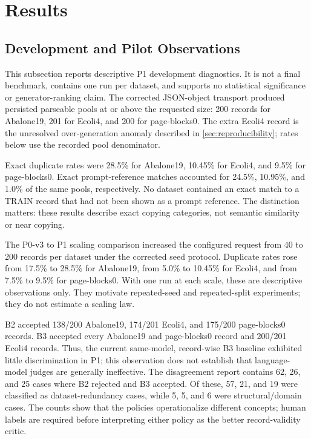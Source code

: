 \section{Results}
\label{sec:results}

\subsection{Development and Pilot Observations}
\label{sec:pilot-results}

This subsection reports descriptive P1 development diagnostics. It is not a
final benchmark, contains one run per dataset, and supports no statistical
significance or generator-ranking claim. The corrected JSON-object transport
produced persisted parseable pools at or above the requested size: 200 records
for Abalone19, 201 for Ecoli4, and 200 for page-blocks0. The extra Ecoli4 record
is the unresolved over-generation anomaly described in
\cref{sec:reproducibility}; rates below use the recorded pool denominator.



Exact duplicate rates were 28.5\% for Abalone19, 10.45\% for Ecoli4, and
9.5\% for page-blocks0. Exact prompt-reference matches accounted for 24.5\%,
10.95\%, and 1.0\% of the same pools, respectively. No dataset contained an
exact match to a TRAIN record that had not been shown as a prompt reference.
The distinction matters: these results describe exact copying categories, not
semantic similarity or near copying.

The P0-v3 to P1 scaling comparison increased the configured request from 40 to
200 records per dataset under the corrected seed protocol. Duplicate rates
rose from 17.5\% to 28.5\% for Abalone19, from 5.0\% to 10.45\% for Ecoli4,
and from 7.5\% to 9.5\% for page-blocks0. With one run at each scale, these are
descriptive observations only. They motivate repeated-seed and repeated-split
experiments; they do not estimate a scaling law.

B2 accepted 138/200 Abalone19, 174/201 Ecoli4, and 175/200 page-blocks0
records. B3 accepted every Abalone19 and page-blocks0 record and 200/201
Ecoli4 records. Thus, the current same-model, record-wise B3 baseline exhibited
little discrimination in P1; this observation does not establish that
language-model judges are generally ineffective. The disagreement report
contains 62, 26, and 25 cases where B2 rejected and B3 accepted. Of these, 57,
21, and 19 were classified as
dataset-redundancy cases, while 5, 5, and 6 were structural/domain cases. The
counts show that the policies operationalize different concepts; human labels
are required before interpreting either policy as the better record-validity
critic.


